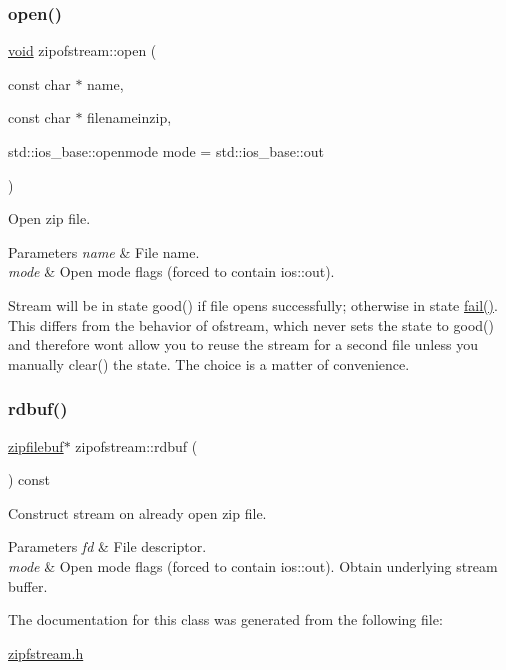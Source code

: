 \subsubsection{\texorpdfstring{open()}{open()}}
{\footnotesize\ttfamily \hyperlink{lp__lib_8h_ac7828c7b2b31d2e11af17bdb6289c5d9}{void} zipofstream\+::open (\begin{DoxyParamCaption}\item[{const char $\ast$}]{name,  }\item[{const char $\ast$}]{filenameinzip,  }\item[{std\+::ios\+\_\+base\+::openmode}]{mode = {\ttfamily std\+:\+:ios\+\_\+base\+:\+:out} }\end{DoxyParamCaption})}



Open zip file. 


\begin{DoxyParams}{Parameters}
{\em name} & File name. \\
\hline
{\em mode} & Open mode flags (forced to contain ios\+::out).\\
\hline
\end{DoxyParams}
Stream will be in state good() if file opens successfully; otherwise in state \hyperlink{_constraint_macros_8h_a73a3b169ac8c3419cbe15327e75ffcfd}{fail()}. This differs from the behavior of ofstream, which never sets the state to good() and therefore won\textquotesingle{}t allow you to reuse the stream for a second file unless you manually clear() the state. The choice is a matter of convenience. \mbox{\label{classzipofstream_a069ea0c4e9b4a9b6fe7a93c277f0cc6d}} 
\subsubsection{\texorpdfstring{rdbuf()}{rdbuf()}}
{\footnotesize\ttfamily \hyperlink{classzipfilebuf}{zipfilebuf}$\ast$ zipofstream\+::rdbuf (\begin{DoxyParamCaption}{ }\end{DoxyParamCaption}) const\hspace{0.3cm}{\ttfamily [inline]}}



Construct stream on already open zip file. 


\begin{DoxyParams}{Parameters}
{\em fd} & File descriptor. \\
\hline
{\em mode} & Open mode flags (forced to contain ios\+::out). Obtain underlying stream buffer. \\
\hline
\end{DoxyParams}


The documentation for this class was generated from the following file\+:\begin{DoxyCompactItemize}
\item 
\hyperlink{zipfstream_8h}{zipfstream.\+h}\end{DoxyCompactItemize}
